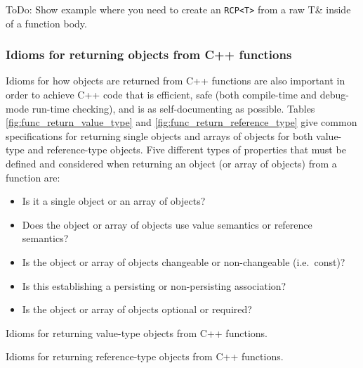 \documentclass[pdf,ps2pdf,11pt]{SANDreport}
\begin{document}
ToDo: Show example where you need to create an {}\texttt{RCP<T>} from
a raw T\& inside of a function body.


%
{}\subsubsection{Idioms for returning objects from C++ functions}
\label{sec:idioms-returning-objects}
%

Idioms for how objects are returned from C++ functions are also
important in order to achieve C++ code that is efficient, safe (both
compile-time and debug-mode run-time checking), and is as
self-documenting as possible.  Tables
{}\ref{fig:func_return_value_type} and
{}\ref{fig:func_return_reference_type} give common specifications for
returning single objects and arrays of objects for both value-type and
reference-type objects.  Five different types of properties that must
be defined and considered when returning an object (or array of
objects) from a function are:

\begin{itemize}

{}\item Is it a single object or an array of objects?

{}\item Does the object or array of objects use value semantics or
reference semantics?

{}\item Is the object or array of objects changeable or non-changeable
(i.e.\ const)?

{}\item Is this establishing a persisting or non-persisting
association?

{}\item Is the object or array of objects optional or required?

\end{itemize}


\begin{table}[p]
%
\begin{center}
%
%

%
%
%
\end{center}
\caption{\label{fig:func_return_value_type}
Idioms for returning value-type objects from C++ functions.}
%
\end{table}


\begin{table}[p]
%
\begin{center}
%
%

%
%
%
\end{center}
\caption{\label{fig:func_return_reference_type}
Idioms for returning reference-type objects from C++ functions.}
%
\end{table}
\end{document}
